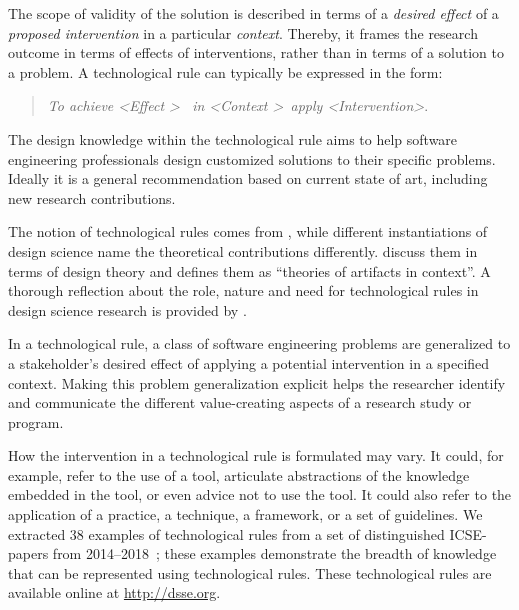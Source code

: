 \documentclass[graybox]{svmult}
\begin{document}
The scope of validity of the solution is described in terms of a  \emph{desired effect} of a \emph{proposed intervention} in a particular \emph{context}. Thereby, it frames the research outcome in terms of effects of interventions, rather than in terms of a solution to a problem. A technological rule can typically be expressed in the form: 

\begin{quote}{\emph{To achieve \textless Effect \textgreater ~ in \textless Context \textgreater~apply \textless Intervention\textgreater}.} 
\end{quote}
The design knowledge within the technological rule aims to help software engineering professionals design customized solutions to their specific problems. Ideally it is a general recommendation based on current state of art, including new research contributions.

The notion of technological rules comes from \cite{bunge_philosophy_1998}, while different instantiations of design science name the theoretical contributions differently. \cite{gregor_positioning_2013} discuss them in terms of design theory and \cite{wieringa_design_2009} defines them as ``theories of artifacts in context''. A thorough reflection about the role, nature and need for  technological rules in design science research is provided by \cite{van_aken_management_2004}. 

In a technological rule, a class of software engineering problems are generalized to a stakeholder's desired effect of applying a potential intervention in a specified context. 
Making this problem generalization explicit helps the researcher identify and communicate the different value-creating aspects of a research study or program.

How the intervention in a technological rule is formulated may vary. It could, for example, refer to the use of a tool, articulate abstractions of the knowledge embedded in the tool, or even advice not to use the tool.
It could also refer to the application of a practice, a technique, a framework, or a set of guidelines. We extracted 38 examples of technological rules from a set of distinguished ICSE-papers from 2014--2018~\citep{Engstrom19arxiv}; these examples demonstrate the breadth of knowledge that can be represented using technological rules. These technological rules are available online at \url{http://dsse.org}.
\end{document}

